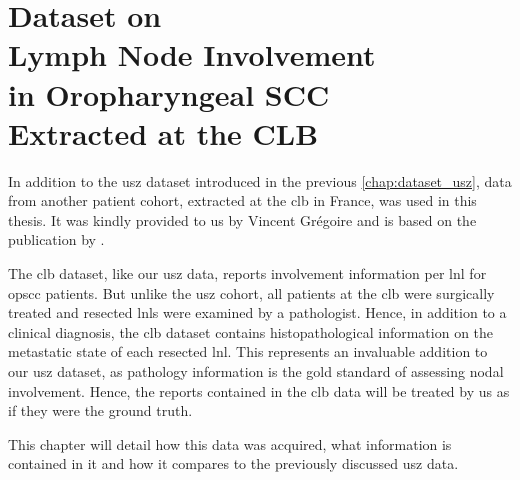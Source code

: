 \documentclass[\relativeRoot/main.tex]{subfiles}
\begin{document}
\chapter[%
CLB Dataset on Lymph Node Involvement in OPSCC%
]{%
Dataset on\\Lymph Node Involvement\\in Oropharyngeal SCC\\Extracted at the CLB%
}
\label{chap:dataset_clb}
\globalreset

In addition to the \gls{usz} dataset introduced in the previous \cref{chap:dataset_usz}, data from another patient cohort, extracted at the \gls{clb} in France, was used in this thesis. It was kindly provided to us by Vincent Grégoire and is based on the publication by .

The \gls{clb} dataset, like our \gls{usz} data, reports involvement information per \gls{lnl} for \gls{opscc} patients. But unlike the \gls{usz} cohort, all patients at the \gls{clb} were surgically treated and resected \glspl{lnl} were examined by a pathologist. Hence, in addition to a clinical diagnosis, the \gls{clb} dataset contains histopathological information on the metastatic state of each resected \gls{lnl}. This represents an invaluable addition to our \gls{usz} dataset, as pathology information is the gold standard of assessing nodal involvement. Hence, the reports contained in the \gls{clb} data will be treated by us as if they were the ground truth.

This chapter will detail how this data was acquired, what information is contained in it and how it compares to the previously discussed \gls{usz} data.







\end{document}
